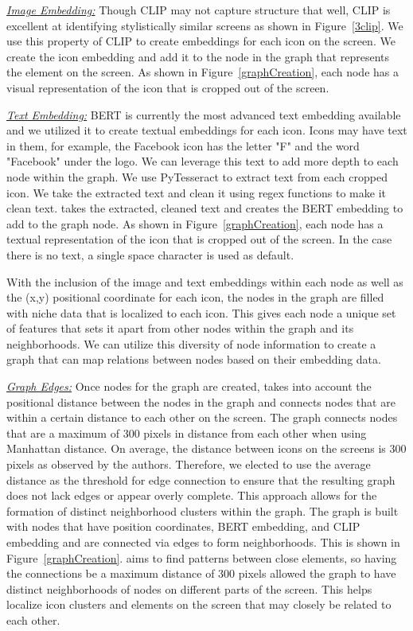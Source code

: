 \underline{\textit{Image Embedding:}} Though CLIP may not capture structure that well, CLIP is excellent at identifying stylistically similar screens as shown in Figure~\ref{3clip}. We use this property of CLIP to create embeddings for each icon on the screen. We create the icon embedding and add it to the node in the graph that represents the element on the screen. As shown in Figure~\ref{graphCreation}, each node has a visual representation of the icon that is cropped out of the screen.
 
\underline{\textit{Text Embedding:}} BERT is currently the most advanced text embedding available and we utilized it to create textual embeddings for each icon. Icons may have text in them, for example, the Facebook icon has the letter "F" and the word "Facebook" under the logo. We can leverage this text to add more depth to each node within the graph. We use PyTesseract to extract text from each cropped icon. We take the extracted text and clean it using regex functions to make it clean text. \FRAME takes the extracted, cleaned text and creates the BERT embedding to add to the graph node. As shown in Figure~\ref{graphCreation}, each node has a textual representation of the icon that is cropped out of the screen. In the case there is no text, a single space character is used as default. 

With the inclusion of the image and text embeddings within each node as well as the (x,y) positional coordinate for each icon, the nodes in the graph are filled with niche data that is localized to each icon. This gives each node a unique set of features that sets it apart from other nodes within the graph and its neighborhoods. We can utilize this diversity of node information to create a graph that can map relations between nodes based on their embedding data. 

\underline{\textit{Graph Edges:}} Once nodes for the graph are created, \FRAME takes into account the positional distance between the nodes in the graph and connects nodes that are within a certain distance to each other on the screen. The graph connects nodes that are a maximum of 300 pixels in distance from each other when using Manhattan distance. On average, the distance between icons on the screens is 300 pixels as observed by the authors. Therefore, we elected to use the average distance as the threshold for edge connection to ensure that the resulting graph does not lack edges or appear overly complete. This approach allows for the formation of distinct neighborhood clusters within the graph. The graph is built with nodes that have position coordinates, BERT embedding, and CLIP embedding and are connected via edges to form neighborhoods. This is shown in Figure~\ref{graphCreation}. \FRAME aims to find patterns between close elements, so having the connections be a maximum distance of 300 pixels allowed the graph to have distinct neighborhoods of nodes on different parts of the screen. This helps localize icon clusters and elements on the screen that may closely be related to each other. 



